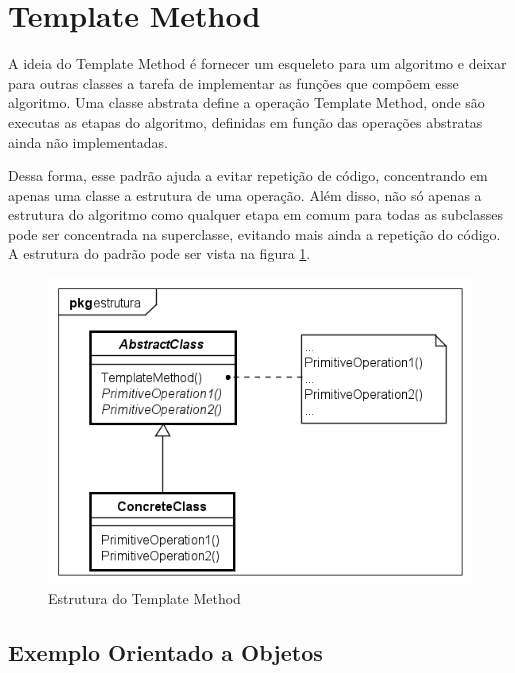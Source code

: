 \section{Template Method}

A ideia do Template Method é fornecer um esqueleto para um algoritmo 
e deixar para outras classes a tarefa de implementar as funções que 
compõem esse algoritmo. Uma classe abstrata define a operação Template 
Method, onde são executas as etapas do algoritmo, definidas em função 
das operações abstratas ainda não implementadas.

Dessa forma, esse padrão ajuda a evitar repetição de código, concentrando 
em apenas uma classe a estrutura de uma operação. Além disso, 
não só apenas a estrutura do algoritmo como qualquer etapa em 
comum para todas as subclasses pode ser concentrada na superclasse, 
evitando mais ainda a repetição do código. A estrutura do padrão 
pode ser vista na figura \ref{tpmethod_struct}.

\begin{figure}[htb]
	\caption{\label{tpmethod_struct}Estrutura do Template Method}
	\begin{center}
	    \includegraphics[scale=0.5]{5_padroes-contexto-funcional/5.3_comportamentais/5.3.10_template-method/templatemethod_estrutura.png}
	\end{center}
\end{figure}

\subsection*{Exemplo Orientado a Objetos}


